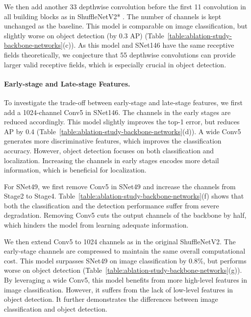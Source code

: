 We then add another 33 depthwise convolution before the first 11 convolution in all building blocks as in ShuffleNetV2* \cite{ma2018shufflenet}.
The number of channels is kept unchanged as the baseline.
This model is comparable on image classification, but slightly worse on object detection (by 0.3 AP) (Table~\ref{table:ablation-study-backbone-networks}(c)).
As this model and SNet146 have the same receptive fields theoretically, we conjecture that 55 depthwise convolutions can provide larger valid receptive fields, which is especially crucial in object detection.

\vspace{-12pt}
\paragraph{Early-stage and Late-stage Features.}

To investigate the trade-off between early-stage and late-stage features, we first add a 1024-channel Conv5 in SNet146.
The channels in the early stages are reduced accordingly.
This model slightly improves the top-1 error, but reduces AP by 0.4 (Table~\ref{table:ablation-study-backbone-networks}(d)).
A wide Conv5 generates more discriminative features, which improves the classification accuracy.
However, object detection focuses on both classification and localization.
Increasing the channels in early stages encodes more detail information, which is beneficial for localization.

For SNet49, we first remove Conv5 in SNet49 and increase the channels from Stage2 to Stage4.
Table~\ref{table:ablation-study-backbone-networks}(f) shows that both the classification and the detection performance suffer from severe degradation.
Removing Conv5 cuts the output channels of the backbone by half, which hinders the model from learning adequate information.

We then extend Conv5 to 1024 channels as in the original ShuffleNetV2.
The early-stage channels are compressed to maintain the same overall computational cost.
This model surpasses SNet49 on image classification by 0.8\%, but performs worse on object detection (Table~\ref{table:ablation-study-backbone-networks}(g)).
By leveraging a wide Conv5, this model benefits from more high-level features in image classification.
However, it suffers from the lack of low-level features in object detection.
It further demonstrates the differences between image classification and object detection.

